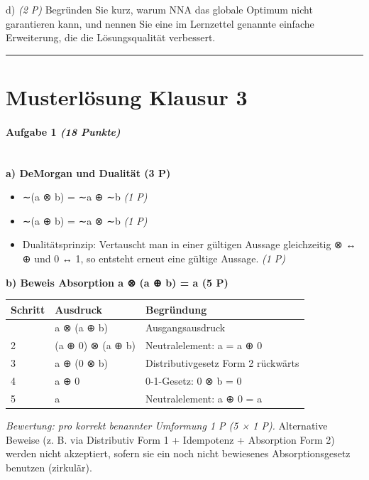 \documentclass[11pt, a4paper]{article}
\begin{document}
d) \textit{(2 P)} Begründen Sie kurz, warum NNA das globale Optimum nicht garantieren kann, und nennen Sie eine im Lernzettel genannte einfache Erweiterung, die die Lösungsqualität verbessert.



\noindent\textcolor{rulegray}{\rule{\linewidth}{0.4pt}}



\section{Musterlösung Klausur 3}

\paragraph{Aufgabe 1 \textit{(18 Punkte)}}\mbox{}\\[2pt]

\textbf{a) DeMorgan und Dualität (3 P)}


\begin{itemize}
  \item ∼(a ⊗ b) = ∼a ⊕ ∼b \textit{(1 P)}
  \item ∼(a ⊕ b) = ∼a ⊗ ∼b \textit{(1 P)}
  \item Dualitätsprinzip: Vertauscht man in einer gültigen Aussage gleichzeitig ⊗ ↔ ⊕ und 0 ↔ 1, so entsteht erneut eine gültige Aussage. \textit{(1 P)}
\end{itemize}

\textbf{b) Beweis Absorption a ⊗ (a ⊕ b) = a (5 P)}



{\small
\begin{tabularx}{\linewidth}{XXX}
\hline
\rowcolor{tableheadbg}
{\color{white}\textbf{Schritt}} & {\color{white}\textbf{Ausdruck}} & {\color{white}\textbf{Begründung}} \\[2pt]
\hline
\endhead
\hline
\endfoot
1 & a ⊗ (a ⊕ b) & Ausgangsausdruck \\
2 & (a ⊕ 0) ⊗ (a ⊕ b) & Neutralelement: a = a ⊕ 0 \\
3 & a ⊕ (0 ⊗ b) & Distributivgesetz Form 2 rückwärts \\
4 & a ⊕ 0 & 0-1-Gesetz: 0 ⊗ b = 0 \\
5 & a & Neutralelement: a ⊕ 0 = a \\
\end{tabularx}
}


\textit{Bewertung: pro korrekt benannter Umformung 1 P (5 × 1 P).} Alternative Beweise (z. B. via Distributiv Form 1 + Idempotenz + Absorption Form 2) werden nicht akzeptiert, sofern sie ein noch nicht bewiesenes Absorptionsgesetz benutzen (zirkulär).
\end{document}

